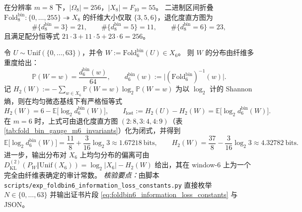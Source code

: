 \begin{enumerate}
  \begin{theorem}\label{thm:terminal-foldbin8-256-to-55-hist}
  在分辨率 \(m=8\) 下，\(|\Omega_8|=256\)，\(|X_8|=F_{10}=55\)。
  二进制区间折叠 \(\mathrm{Fold}^{\mathrm{bin}}_8:\{0,\dots,255\}\twoheadrightarrow X_8\) 的纤维大小仅取
  \(\{3,5,6\}\)，退化度直方图为
  \[
  \#\{d^{\mathrm{bin}}_8=3\}=21,\qquad
  \#\{d^{\mathrm{bin}}_8=5\}=11,\qquad
  \#\{d^{\mathrm{bin}}_8=6\}=23,
  \]
  且满足配分恒等式 \(21\cdot 3+11\cdot 5+23\cdot 6=256\)。
  \end{theorem}

  

  \begin{theorem}\label{thm:terminal-foldbin6-information-loss-constants}
  令 \(U\sim\mathrm{Unif}(\{0,\dots,63\})\)，并令 \(W:=\mathrm{Fold}^{\mathrm{bin}}_6(U)\in X_6\)。
  则 \(W\) 的分布由纤维多重度给出：
  \[
  \mathbb{P}(W=w)=\frac{d^{\mathrm{bin}}_6(w)}{64},\qquad d^{\mathrm{bin}}_6(w):=\bigl|(\mathrm{Fold}^{\mathrm{bin}}_6)^{-1}(w)\bigr|.
  \]
  记 \(H_2(W):=-\sum_{w\in X_6}\mathbb{P}(W=w)\log_2\mathbb{P}(W=w)\) 为以 \(\log_2\) 计的 Shannon 熵，则在均匀微态基线下有严格恒等式
  \[
  H_2(W)=6-\mathbb{E}\bigl[\log_2 d^{\mathrm{bin}}_6(W)\bigr],
  \qquad
  I_{\mathrm{lost}}:=H_2(U)-H_2(W)=\mathbb{E}\bigl[\log_2 d^{\mathrm{bin}}_6(W)\bigr].
  \]
  在 \(m=6\) 时，上式可由退化度直方图 \((2{:}8,3{:}4,4{:}9)\)（表 \ref{tab:fold_bin_gauge_m6_invariants}）化为闭式，并得到
  \[
  \mathbb{E}\bigl[\log_2 d^{\mathrm{bin}}_6(W)\bigr]
  =\frac{11}{8}+\frac{3}{16}\log_2 3
  \approx 1.67218\ \text{bits},
  \qquad
  H_2(W)=\frac{37}{8}-\frac{3}{16}\log_2 3\approx 4.32782\ \text{bits}.
  \]
  进一步，输出分布对 \(X_6\) 上均匀分布的偏离可由
  \(
  D^{(2)}_{\mathrm{KL}}(P_W\Vert \mathrm{Unif}(X_6))=\log_2|X_6|-H_2(W)
  \)
  给出，其在 window-\(6\) 上为一个完全由纤维表确定的审计常数。
  \emph{核验要点：}由脚本 \texttt{scripts/exp\_foldbin6\_information\_loss\_constants.py} 直接枚举 \(N\in\{0,\dots,63\}\) 并输出证书片段 \eqref{eq:foldbin6_information_loss_constants} 与 JSON。
  \end{theorem}
  


\end{enumerate}
